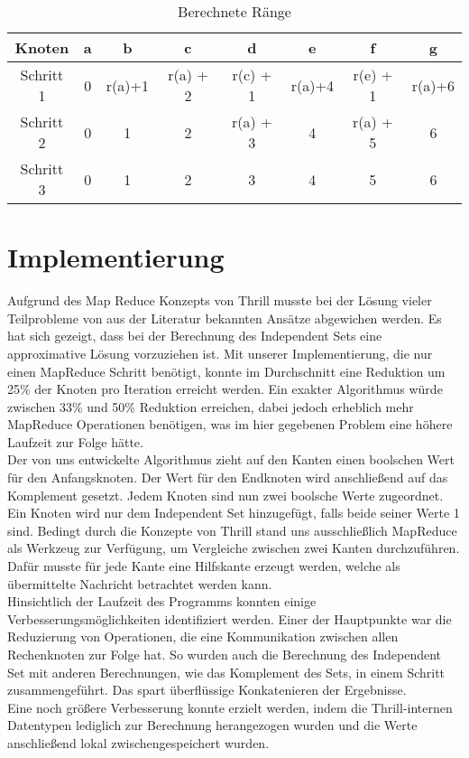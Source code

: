 \documentclass[a0,portrait]{a0poster}
\begin{document}
\begin{multicols}{2}
\begin{table}[H]          %
\centering
\begin{tabular*}{\linewidth}{@{\extracolsep{\fill}}cccccccc}
\hline
\hline
\rule[-7pt]{0pt}{23pt}  Knoten & a & b & c & d &e & f & g\\
\hline
\rule[-6pt]{0pt}{21pt}   Schritt 1 & 0 & r(a)+1 & r(a) + 2 & r(c) + 1  & r(a)+4  & r(e) + 1 & r(a)+6\\
\hline
\rule[-6pt]{0pt}{21pt}   Schritt 2 & 0 & 1 & 2 & r(a) + 3  & 4  & r(a) + 5 & 6\\
\hline
\rule[-6pt]{0pt}{21pt}   Schritt 3 & 0 & 1 & 2 & 3  & 4  & 5 & 6\\
\hline
\hline
\end{tabular*}  
\caption[]{Berechnete Ränge} 
\label{Raumtemperatur}                             %
\end{table}

\section*{Implementierung}
Aufgrund des Map Reduce Konzepts von Thrill musste bei der Lösung vieler Teilprobleme von aus der Literatur bekannten Ansätze abgewichen werden. 
Es hat sich gezeigt, dass bei der Berechnung des Independent Sets eine approximative Lösung vorzuziehen ist. 
Mit unserer Implementierung, die nur einen MapReduce Schritt benötigt, konnte im Durchschnitt eine Reduktion um 25\% der Knoten pro Iteration erreicht werden. 
Ein exakter Algorithmus würde zwischen 33\% und 50\% Reduktion erreichen, dabei jedoch erheblich mehr MapReduce Operationen benötigen, was im hier gegebenen 
Problem eine höhere Laufzeit zur Folge hätte.\\
Der von uns entwickelte Algorithmus zieht auf den Kanten einen boolschen Wert für den Anfangsknoten. Der Wert für den Endknoten wird anschließend auf 
das Komplement gesetzt. Jedem Knoten sind nun zwei boolsche Werte zugeordnet. Ein Knoten wird nur dem Independent Set hinzugefügt, falls beide seiner Werte 1 sind. 
Bedingt durch die Konzepte von Thrill stand uns ausschließlich MapReduce als Werkzeug zur Verfügung, um Vergleiche zwischen zwei Kanten durchzuführen. 
Dafür musste für jede Kante eine Hilfskante erzeugt werden, welche als übermittelte Nachricht betrachtet werden kann. \\ 
Hinsichtlich der Laufzeit des Programms konnten einige Verbesserungsmöglichkeiten identifiziert werden. Einer der Hauptpunkte war die Reduzierung von Operationen, die 
eine Kommunikation zwischen allen Rechenknoten zur Folge hat. So wurden auch die Berechnung des Independent Set mit anderen Berechnungen, wie das Komplement des Sets, 
in einem Schritt zusammengeführt. Das spart überflüssige Konkatenieren der Ergebnisse.\\
Eine noch größere Verbesserung konnte erzielt werden, indem die Thrill-internen Datentypen lediglich zur Berechnung herangezogen wurden und die Werte anschließend lokal zwischengespeichert wurden.


\end{multicols}
\end{document}
